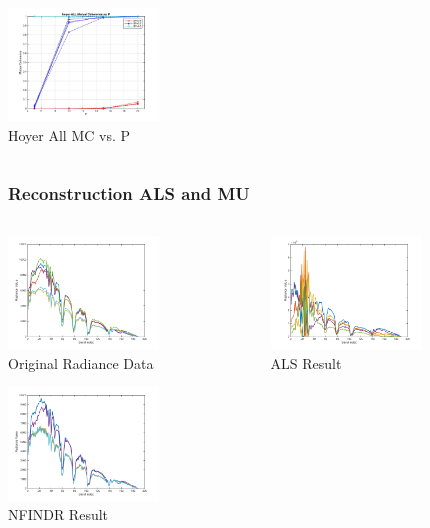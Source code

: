 \documentclass{beamer}
\begin{document}
\begin{frame}
\begin{columns}
\begin{column}{0.33\textwidth}
        \includegraphics[width=4cm,center]{hoyer-ALL_Mutual_Coherence}
        \\ Hoyer All MC  vs. P
        \centering
    \end{column}
\end{columns}
\end{frame}


\begin{frame}
\frametitle{Reconstruction ALS and MU}
\begin{columns}
    \begin{column}{0.33\textwidth}
        \includegraphics[width=4cm,center]{radiance}
        \\ Original Radiance Data
        \centering

        \includegraphics[width=4cm,center]{recon_nfindr}
        \\ NFINDR Result
        \centering
    \end{column}
    \begin{column}{0.33\textwidth}
        \includegraphics[width=4cm,center]{recon_als}
        \\ ALS Result
        \centering


\end{column}
\end{columns}
\end{frame}
\end{document}
